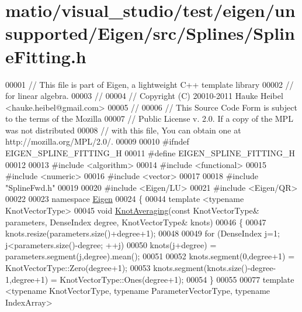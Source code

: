 \hypertarget{matio_2visual__studio_2test_2eigen_2unsupported_2_eigen_2src_2_splines_2_spline_fitting_8h_source}{}\section{matio/visual\+\_\+studio/test/eigen/unsupported/\+Eigen/src/\+Splines/\+Spline\+Fitting.h}
\label{matio_2visual__studio_2test_2eigen_2unsupported_2_eigen_2src_2_splines_2_spline_fitting_8h_source}

\begin{DoxyCode}
00001 \textcolor{comment}{// This file is part of Eigen, a lightweight C++ template library}
00002 \textcolor{comment}{// for linear algebra.}
00003 \textcolor{comment}{//}
00004 \textcolor{comment}{// Copyright (C) 20010-2011 Hauke Heibel <hauke.heibel@gmail.com>}
00005 \textcolor{comment}{//}
00006 \textcolor{comment}{// This Source Code Form is subject to the terms of the Mozilla}
00007 \textcolor{comment}{// Public License v. 2.0. If a copy of the MPL was not distributed}
00008 \textcolor{comment}{// with this file, You can obtain one at http://mozilla.org/MPL/2.0/.}
00009 
00010 \textcolor{preprocessor}{#ifndef EIGEN\_SPLINE\_FITTING\_H}
00011 \textcolor{preprocessor}{#define EIGEN\_SPLINE\_FITTING\_H}
00012 
00013 \textcolor{preprocessor}{#include <algorithm>}
00014 \textcolor{preprocessor}{#include <functional>}
00015 \textcolor{preprocessor}{#include <numeric>}
00016 \textcolor{preprocessor}{#include <vector>}
00017 
00018 \textcolor{preprocessor}{#include "SplineFwd.h"}
00019 
00020 \textcolor{preprocessor}{#include <Eigen/LU>}
00021 \textcolor{preprocessor}{#include <Eigen/QR>}
00022 
00023 \textcolor{keyword}{namespace }\hyperlink{namespace_eigen}{Eigen}
00024 \{
00044   \textcolor{keyword}{template} <\textcolor{keyword}{typename} KnotVectorType>
00045   \textcolor{keywordtype}{void} \hyperlink{group___splines___module_ga9474da5ed68bbd9a6788a999330416d6}{KnotAveraging}(\textcolor{keyword}{const} KnotVectorType& parameters, DenseIndex degree, KnotVectorType& 
      knots)
00046   \{
00047     knots.resize(parameters.size()+degree+1);      
00048 
00049     \textcolor{keywordflow}{for} (DenseIndex j=1; j<parameters.size()-degree; ++j)
00050       knots(j+degree) = parameters.segment(j,degree).mean();
00051 
00052     knots.segment(0,degree+1) = KnotVectorType::Zero(degree+1);
00053     knots.segment(knots.size()-degree-1,degree+1) = KnotVectorType::Ones(degree+1);
00054   \}
00055 
00077   \textcolor{keyword}{template} <\textcolor{keyword}{typename} KnotVectorType, \textcolor{keyword}{typename} ParameterVectorType, \textcolor{keyword}{typename} IndexArray>

\end{DoxyCode}
